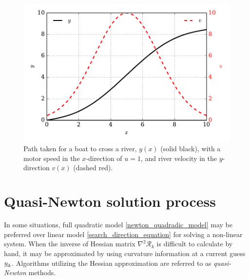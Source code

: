 \begin{figure}
  \centering
    \includegraphics[width=\linewidth]{images/fenics_intro/river_cross.pdf}
  \caption[Nonlinear problem example]{Path taken for a boat to cross a river, $y(x)$ (solid black), with a motor speed in the $x$-direction of $u = 1$, and river velocity in the $y$-direction $v(x)$ (dashed red).}
  \label{river_cross_image}
\end{figure}




\section{Quasi-Newton solution process}

In some situations, full quadratic model \cref{newton_quadradic_model} may be preferred over linear model \cref{search_direction_equation} for solving a non-linear system.  When the inverse of Hessian matrix $\nabla^2 \mathscr{R}_k$ is difficult to calculate by hand, it may be approximated by using curvature information at a current guess $\underline{u}_k$.  Algorithms utilizing the Hessian approximation are referred to as \emph{quasi-Newton} methods.

